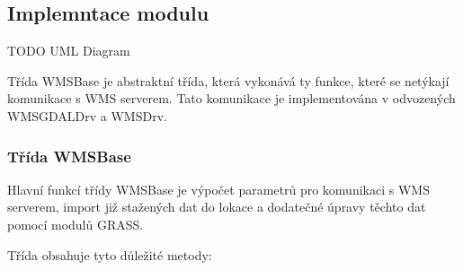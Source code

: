 \documentclass[a4paper,12pt]{article}
\begin{document}
\subsection{Implemntace modulu}

TODO UML Diagram

Třída WMSBase je abstraktní třída, která vykonává ty funkce, které se netýkají komunikace s WMS serverem. Tato komunikace je implementována v odvozených WMSGDALDrv a WMSDrv.

\subsubsection{Třída WMSBase}


Hlavní funkcí třídy WMSBase je výpočet parametrů pro komunikaci s WMS serverem, import již stažených dat do lokace a dodatečné úpravy těchto dat pomocí modulů GRASS. 

Třída obsahuje tyto důležité metody:  
\end{document}

